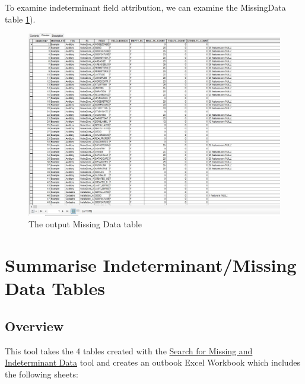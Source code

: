 \documentclass[openany]{book}
\theoremstyle{definition}
\theoremstyle{definition}
\theoremstyle{definition}
\theoremstyle{remark}
\begin{document}
To examine indeterminant field attribution, we can examine the
MissingData table \ref{fig:indtSearchmissingData}).

\begin{figure}[H]

{\centering \includegraphics[width=6.25in,]{figures/indtSearch-missingData} 

}

\caption{The output Missing Data table}\label{fig:indtSearchmissingData}
\end{figure}

\hypertarget{summIndt}{\chapter{Summarise Indeterminant/Missing Data
Tables}\label{summIndt}}

\section{Overview}\label{overview-10}

This tool takes the 4 tables created with the
\protect\hyperlink{indtSearch}{Search for Missing and Indeterminant
Data} tool and creates an outbook Excel Workbook which includes the
following sheets:
\end{document}
